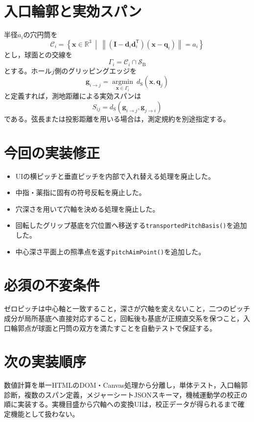 \documentclass[a4paper,11pt]{ltjsarticle}
\newcommand{\vect}[1]{\bm{#1}}
\begin{document}
\section{入口輪郭と実効スパン}
半径\(a_i\)の穴円筒を
\begin{equation}
\mathcal C_i=
\left\{\vect x\in\mathbb R^3\ \middle|\
\left\|\left(\vect I-\vect d_i\vect d_i^{\mathsf T}\right)
\left(\vect x-\vect q_i\right)\right\|=a_i\right\}
\end{equation}
とし，球面との交線を
\begin{equation}
\Gamma_i=\mathcal C_i\cap\mathcal S_{\mathrm B}
\end{equation}
とする。ホール\(j\)側のグリッピングエッジを
\begin{equation}
\vect g_{i\to j}=\underset{\vect x\in\Gamma_i}{\operatorname{argmin}}\ d_{\mathrm S}(\vect x,\vect q_j)
\end{equation}
と定義すれば，測地距離による実効スパンは
\begin{equation}
S_{ij}=d_{\mathrm S}(\vect g_{i\to j},\vect g_{j\to i})
\end{equation}
である。弦長または投影距離を用いる場合は，測定規約を別途指定する。

\section{今回の実装修正}
\begin{itemize}
\item UIの横ピッチと垂直ピッチを内部で入れ替える処理を廃止した。
\item 中指・薬指に固有の符号反転を廃止した。
\item 穴深さを用いて穴軸を決める処理を廃止した。
\item 回転したグリップ基底を穴位置へ移送する\texttt{transportedPitchBasis()}を追加した。
\item 中心深さ平面上の照準点を返す\texttt{pitchAimPoint()}を追加した。
\end{itemize}

\section{必須の不変条件}
ゼロピッチは中心軸と一致すること，深さが穴軸を変えないこと，二つのピッチ成分が局所基底へ直接対応すること，回転後も基底が正規直交系を保つこと，入口輪郭点が球面と円筒の双方を満たすことを自動テストで保証する。

\section{次の実装順序}
数値計算を単一HTMLのDOM・Canvas処理から分離し，単体テスト，入口輪郭診断，複数のスパン定義，メジャーシートJSONスキーマ，機械運動学の校正の順に実装する。実機目盛から穴軸への変換UIは，校正データが得られるまで確定機能として扱わない。
\end{document}
